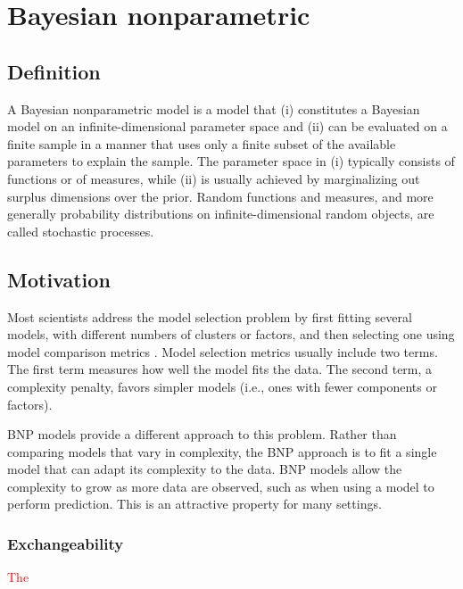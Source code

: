\chapter{Bayesian nonparametric}

\section{Definition} \label{BNP_def}
A Bayesian nonparametric model is a model that (i) constitutes a Bayesian model on an infinite-dimensional parameter space and (ii) can be evaluated on a finite sample in a manner that uses only a finite subset of the available parameters to explain the sample.
The parameter space in (i) typically consists of functions or of measures, while (ii) is usually achieved by marginalizing out surplus dimensions over the prior. Random functions and measures, and more generally probability distributions on infinite-dimensional random objects, are called stochastic processes.


\section{Motivation}
Most scientists address the model selection problem by first fitting several models, with different numbers of clusters or factors, and then selecting one using model comparison metrics \cite{Claeskens:1251912}. Model selection metrics usually include two terms. The first term measures how well the model fits the data. The second term, a complexity penalty, favors simpler models (i.e., ones with fewer components or factors).

\gls{BNP} models provide a different approach to this problem. Rather than comparing models that vary in complexity, the \gls{BNP} approach is to fit a single model that can adapt its complexity to the data. \gls{BNP} models allow the complexity to grow as more data are observed, such as when using a model to perform prediction. This is an attractive property for many settings.


\subsection{Exchangeability}
\textcolor{red}{The }

